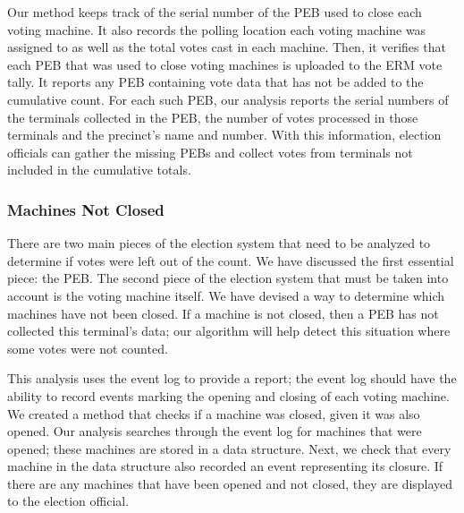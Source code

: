 Our method keeps track of the serial number of the PEB used to close each voting machine. It also records the polling location each voting machine was assigned to as well as the total votes cast in each machine. Then,  it verifies that each PEB that was used to close voting machines is uploaded to the ERM vote tally. It reports any PEB containing vote data that has not be added to the cumulative count.  For each such PEB, our analysis reports the serial numbers of the terminals collected in the PEB, the number of votes processed in those terminals and the precinct's name and number. With this information, election officials can gather the missing PEBs and collect votes from terminals not included in the cumulative totals.

\subsubsection{Machines Not Closed}
There are two main pieces of the election system that need to be analyzed to determine if votes were left out of the count.  We have discussed the first essential piece: the PEB.  The second piece of the election system that must be taken into account is the voting machine itself.   We have devised a way to determine which machines have not been closed.  If a machine is not closed, then a PEB has not collected this terminal's data; our algorithm will help detect this situation where some votes were not counted.  

This analysis uses the event log to provide a report; the event log should have the ability to record events marking the opening and closing of each voting machine.  We created a method that checks if a machine was closed, given it was also opened.  Our analysis searches through the event log for machines that were opened; these machines are stored in a data structure.  Next, we check that every machine in the data structure also recorded an event representing its closure.  If there are any machines that have been opened and not closed, they are displayed to the election official.  
